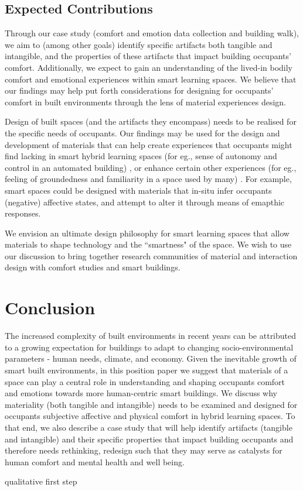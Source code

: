 \documentclass[acmconf, anonymous, review]{acmart}
\begin{document}
\subsection{Expected Contributions}
Through our case study (comfort and emotion data collection and building walk), we aim to (among other goals) identify specific artifacts both tangible and intangible, and the properties of these artifacts that impact building occupants' comfort. Additionally, we expect to gain an understanding of the lived-in bodily comfort and emotional experiences within smart learning spaces. We believe that our findings may help put forth considerations for designing for occupants' comfort in built environments through the lens of material experiences design. 

Design of built spaces (and the artifacts they encompass) needs to be realised for the specific needs of occupants. Our findings may be used for the design and development of materials that can help create experiences that occupants might find lacking in smart hybrid learning spaces (for eg., sense of autonomy and control in an automated building) \cite{moreno2014user}, or enhance certain other experiences (for eg., feeling of groundedness and familiarity in a space used by many) \cite{rehman2022personalisedcomfort}.  For example, 
smart spaces could be designed with materials that in-situ infer occupants (negative) affective states, and attempt to alter it through means of emapthic responses. 

We envision an ultimate design philosophy for smart learning spaces that allow materials to shape technology and the ``smartness" of the space. We wish to use our discussion to bring together research communities of material and interaction design with comfort studies and smart buildings.


\section{Conclusion}
The increased complexity of built environments in recent years can be attributed to a growing expectation for buildings to adapt to changing socio-environmental parameters - human needs, climate, and economy. Given the inevitable growth of smart built environments, in this position paper we suggest that materials of a space can play a central role in understanding and shaping occupants comfort and emotions towards more human-centric smart buildings. We discuss why materiality (both tangible and intangible) needs to be examined and designed for occupants subjective affective and physical comfort in hybrid learning spaces. To that end, we also describe a case study that will help identify artifacts (tangible and intangible) and their specific properties that impact building occupants and therefore needs rethinking, redesign such that they may serve as catalysts for human comfort and mental health and well being. 

qualitative first step




\end{document}
